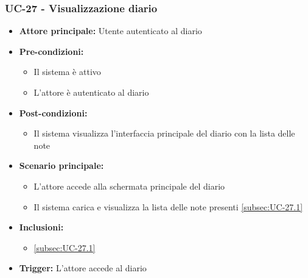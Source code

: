\documentclass[a4paper,12pt]{article}
\begin{document}
\subsubsection{UC-27 - Visualizzazione diario} \label{subsec:UC-27}
\begin{itemize}
    \item \textbf{Attore principale:} Utente autenticato al diario
    \item \textbf{Pre-condizioni:}
    \begin{itemize}
        \item Il sistema è attivo
        \item L'attore è autenticato al diario
    \end{itemize}
    \item \textbf{Post-condizioni:} 
    \begin{itemize}
        \item Il sistema visualizza l'interfaccia principale del diario con la lista delle note
    \end{itemize}
    \item \textbf{Scenario principale:} 
    \begin{itemize}
        \item L'attore accede alla schermata principale del diario
        \item Il sistema carica e visualizza la lista delle note presenti \ref{subsec:UC-27.1}
    \end{itemize}
    \item \textbf{Inclusioni:}
    \begin{itemize}
        \item \ref{subsec:UC-27.1}
    \end{itemize}
    \item \textbf{Trigger:} L'attore accede al diario
\end{itemize}
\end{document}
